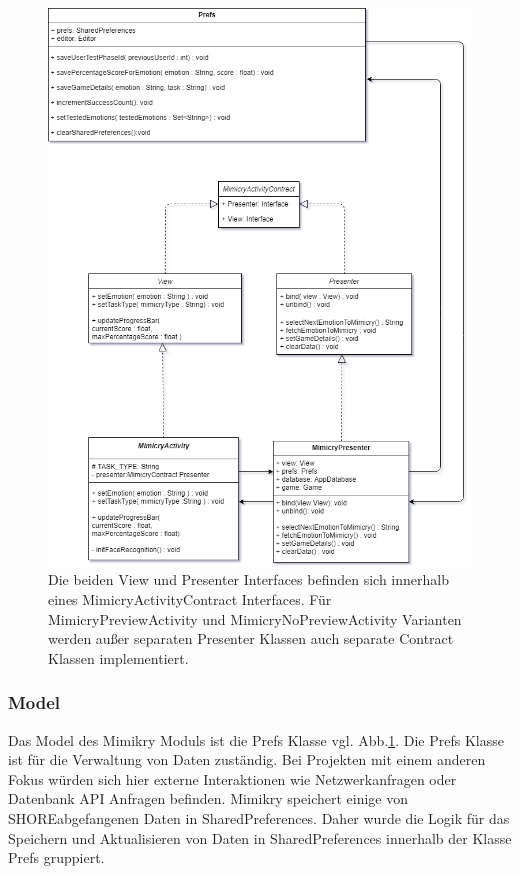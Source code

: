 \begin{figure}
    \centering\includegraphics[width=390pt]{res/mvp_final.png}
\caption{Die beiden View und Presenter Interfaces befinden sich innerhalb eines MimicryActivityContract Interfaces. Für MimicryPreviewActivity und MimicryNoPreviewActivity Varianten werden außer separaten Presenter Klassen auch separate Contract Klassen implementiert.}
\label{architekture}
\end{figure}

\subsubsection{Model}
Das Model des Mimikry Moduls ist die Prefs Klasse vgl. Abb.\ref{architekture}. Die Prefs Klasse ist für die Verwaltung von Daten zuständig. Bei Projekten mit einem anderen Fokus würden sich hier externe Interaktionen wie Netzwerkanfragen oder Datenbank API Anfragen befinden. Mimikry speichert einige von SHORE\re abgefangenen Daten in SharedPreferences. Daher wurde die Logik für das Speichern und Aktualisieren von Daten in SharedPreferences innerhalb der Klasse Prefs gruppiert.

